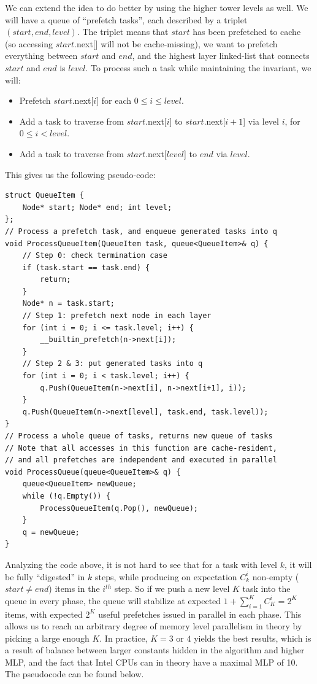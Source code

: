 \documentclass[11pt, usletter]{article}
\begin{document}
We can extend the idea to do better by using the higher tower levels as well. 
We will have a queue of ``prefetch tasks'', each described by a triplet $(start,end,level)$. 
The triplet means that $start$ has been prefetched to cache (so accessing $start$.next[] will not be cache-missing), 
we want to prefetch everything between $start$ and $end$,
and the highest layer linked-list that connects $start$ and $end$ is $level$. 
To process such a task while maintaining the invariant, we will: 
\begin{itemize}
[topsep=0pt,partopsep=0pt,itemsep=0pt,parsep=0pt,fullwidth,itemindent=\parindent,listparindent=\parindent]
\item Prefetch $start$.next[$i$] for each $0\leq i\leq level$.
\item Add a task to traverse from $start$.next[$i$] to $start$.next[$i+1$] via level $i$, for $0\leq i<level$.
\item Add a task to traverse from $start$.next[$level$] to $end$ via $level$.
\end{itemize}

This gives us the following pseudo-code:

\singlespacing\begin{codebox}
\begin{verbatim}
struct QueueItem {
    Node* start; Node* end; int level;
};
// Process a prefetch task, and enqueue generated tasks into q
void ProcessQueueItem(QueueItem task, queue<QueueItem>& q) {
    // Step 0: check termination case
    if (task.start == task.end) {
        return;
    }
    Node* n = task.start;
    // Step 1: prefetch next node in each layer
    for (int i = 0; i <= task.level; i++) {
        __builtin_prefetch(n->next[i]);
    }
    // Step 2 & 3: put generated tasks into q
    for (int i = 0; i < task.level; i++) {
        q.Push(QueueItem(n->next[i], n->next[i+1], i));
    }
    q.Push(QueueItem(n->next[level], task.end, task.level));
}
// Process a whole queue of tasks, returns new queue of tasks
// Note that all accesses in this function are cache-resident,
// and all prefetches are independent and executed in parallel
void ProcessQueue(queue<QueueItem>& q) {
    queue<QueueItem> newQueue;
    while (!q.Empty()) {
        ProcessQueueItem(q.Pop(), newQueue);
    }
    q = newQueue;
}	
\end{verbatim}
\end{codebox}\doublespacing

Analyzing the code above, it is not hard to see that for a task with level $k$, 
it will be fully ``digested'' in $k$ steps, 
while producing on expectation $C_k^i$ non-empty ($start\neq end$) items in the $i^{th}$ step. 
So if we push a new level $K$ task into the queue in every phase, 
the queue will stabilize at expected $1+\sum_{i=1}^K C_K^i=2^K$ items, 
with expected $2^K$ useful prefetches issued in parallel in each phase.
This allows us to reach an arbitrary degree of memory level parallelism in theory by picking a large enough $K$.
In practice, $K=3$ or $4$ yields the best results, 
which is a result of balance between larger constants hidden in the algorithm and higher MLP, 
and the fact that Intel CPUs can in theory have a maximal MLP of 10.
The pseudocode can be found below.
\end{document}
